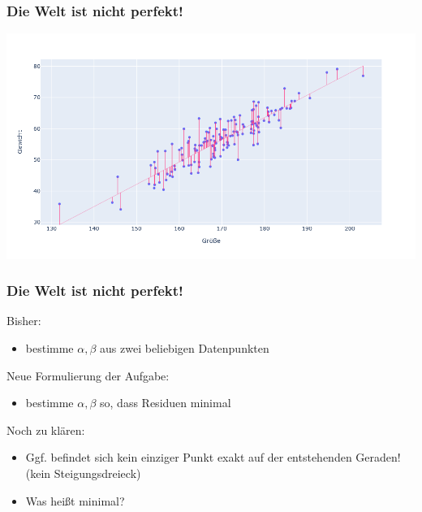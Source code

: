 
\begin{frame}
\frametitle{Die Welt ist nicht perfekt!}

\begin{center}
	\includegraphics[width=\linewidth]{fig7/still-artifical.png}
\end{center}

\end{frame}


\begin{frame}
\frametitle{Die Welt ist nicht perfekt!}

Bisher:
\begin{itemize}
	\item bestimme $\alpha, \beta$ aus zwei beliebigen Datenpunkten
\end{itemize}

Neue Formulierung der Aufgabe:
\begin{itemize}
	\item bestimme $\alpha, \beta$ so, dass Residuen \alert{minimal}
\end{itemize}

Noch zu klären:
\begin{itemize}
	\item Ggf. befindet sich kein einziger Punkt exakt auf der entstehenden Geraden! (kein Steigungsdreieck)
	\item Was heißt minimal?
\end{itemize}

\end{frame}



